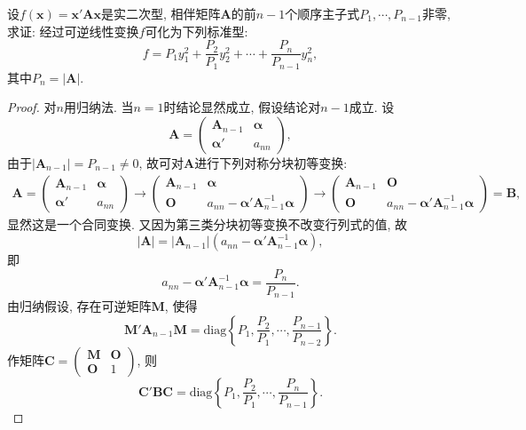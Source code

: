 \documentclass[../../main.tex]{subfiles}%
\begin{document}
\begin{proposition}\label{proposition:利用顺序主子式计算二次型的标准型}
设$f(\boldsymbol{x}) = \boldsymbol{x}'\boldsymbol{A}\boldsymbol{x}$是实二次型, 相伴矩阵$\boldsymbol{A}$的前$n - 1$个顺序主子式$P_1, \cdots, P_{n - 1}$非零, 求证: 经过可逆线性变换$f$可化为下列标准型:
\[
f = P_1y_1^2 + \frac{P_2}{P_1}y_2^2 + \cdots + \frac{P_n}{P_{n - 1}}y_n^2,
\]
其中$P_n = |\boldsymbol{A}|$.
\end{proposition}
\begin{proof}

对$n$用归纳法. 当$n = 1$时结论显然成立, 假设结论对$n - 1$成立. 设
\[
\boldsymbol{A}=\begin{pmatrix}
\boldsymbol{A}_{n - 1} & \boldsymbol{\alpha} \\
\boldsymbol{\alpha}' & a_{nn}
\end{pmatrix},
\]
由于$|\boldsymbol{A}_{n - 1}| = P_{n - 1}\neq 0$, 故可对$\boldsymbol{A}$进行下列对称分块初等变换:
\begin{align*}
\boldsymbol{A}=\begin{pmatrix}
\boldsymbol{A}_{n - 1} & \boldsymbol{\alpha} \\
\boldsymbol{\alpha}' & a_{nn}
\end{pmatrix}
\rightarrow
\begin{pmatrix}
\boldsymbol{A}_{n - 1} & \boldsymbol{\alpha} \\
\boldsymbol{O} & a_{nn}-\boldsymbol{\alpha}'\boldsymbol{A}_{n - 1}^{-1}\boldsymbol{\alpha}
\end{pmatrix}
\rightarrow
\begin{pmatrix}
\boldsymbol{A}_{n - 1} & \boldsymbol{O} \\
\boldsymbol{O} & a_{nn}-\boldsymbol{\alpha}'\boldsymbol{A}_{n - 1}^{-1}\boldsymbol{\alpha}
\end{pmatrix}
=\boldsymbol{B},
\end{align*}
显然这是一个合同变换. 又因为第三类分块初等变换不改变行列式的值, 故
\[
|\boldsymbol{A}| = |\boldsymbol{A}_{n - 1}|(a_{nn}-\boldsymbol{\alpha}'\boldsymbol{A}_{n - 1}^{-1}\boldsymbol{\alpha}),
\]
即
\[
a_{nn}-\boldsymbol{\alpha}'\boldsymbol{A}_{n - 1}^{-1}\boldsymbol{\alpha}=\frac{P_n}{P_{n - 1}}.
\]
由归纳假设, 存在可逆矩阵$\boldsymbol{M}$, 使得
\[
\boldsymbol{M}'\boldsymbol{A}_{n - 1}\boldsymbol{M}=\text{diag}\left\{P_1, \frac{P_2}{P_1}, \cdots, \frac{P_{n - 1}}{P_{n - 2}}\right\}.
\]
作矩阵$\boldsymbol{C}=\begin{pmatrix}
\boldsymbol{M} & \boldsymbol{O} \\
\boldsymbol{O} & 1
\end{pmatrix}$, 则
\[
\boldsymbol{C}'\boldsymbol{B}\boldsymbol{C}=\text{diag}\left\{P_1, \frac{P_2}{P_1}, \cdots, \frac{P_n}{P_{n - 1}}\right\}. 
\] 

\end{proof}
\end{document}
